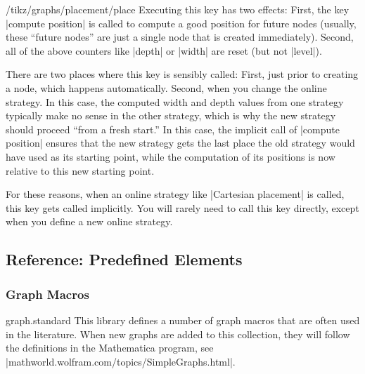\begin{key}{/tikz/graphs/placement/place}
  Executing this key has two effects: First, the key
  |compute position| is called to compute a good 
  position for future nodes (usually, these ``future nodes'' are just
  a single node that is created immediately). Second, all of the above
  counters like |depth| or |width| are reset (but not |level|).

  There are two places where this key is sensibly called: First, just
  prior to creating a node, which happens automatically. Second, when
  you change the online strategy. In this case, the computed width and
  depth values from one strategy typically make no sense in the other
  strategy, which is why the new strategy should proceed ``from a
  fresh start.'' In this case, the implicit call of |compute position|
  ensures that the new strategy gets the last place the old strategy
  would have used as its starting point, while the computation of its
  positions is now relative to this new starting point.

  For these reasons, when an online strategy like
  |Cartesian placement| is called, this key gets called
  implicitly. You will rarely need to call this key directly, except
  when you define a new online strategy.
\end{key}



\subsection{Reference: Predefined Elements}

\label{section-library-graphs-reference}


\subsubsection{Graph Macros}
\label{section-library-graphs-reference-macros}

\begin{tikzlibrary}{graph.standard}
  This library defines a number of graph macros that are often used in
  the literature. When new graphs are added to this collection, they
  will follow the definitions in the Mathematica program, see
  |mathworld.wolfram.com/topics/SimpleGraphs.html|. 
\end{tikzlibrary}


